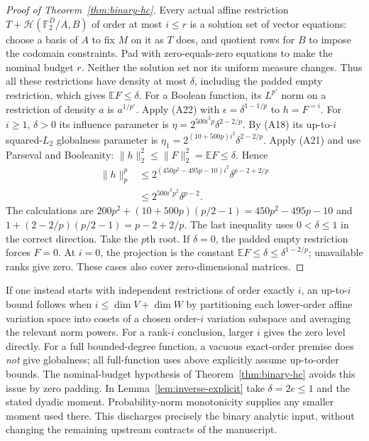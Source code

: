 \begin{proof}[Proof of Theorem~\ref{thm:binary-hc}]
Every actual affine restriction $T+\mathcal H(\mathbb F_2^D/A,B)$ of
order at most $i\le r$ is a solution set of vector equations:
choose a basis of $A$ to fix $M$ on it as $T$ does, and quotient rows
for $B$ to impose the codomain constraints. Pad with zero-equals-zero
equations to make the nominal budget $r$. Neither the solution set nor
its uniform measure changes. Thus all these restrictions have density
at most $\delta$, including the padded empty restriction, which gives
$\mathbb EF\le\delta$.
For a Boolean function, its $L^{p'}$ norm on a restriction of density
$a$ is $a^{1/p'}$. Apply (A22) with
$\epsilon=\delta^{1-1/p}$ to $h=F^{=i}$. For $i\ge1$, $\delta>0$ its
influence parameter is
$\eta=2^{500i^2p}\delta^{2-2/p}$.
By (A18) its up-to-$i$ squared-$L_2$ globalness parameter is
$\eta_1=2^{(10+500p)i^2}\delta^{2-2/p}$.
Apply (A21) and use Parseval and Booleanity:
$\|h\|_2^2\le\|F\|_2^2=\mathbb EF\le\delta$. Hence
\[
 \begin{split}
 \|h\|_p^p
 &\le2^{(450p^2-495p-10)i^2}\delta^{p-2+2/p}\\
 &\le2^{500i^2p^2}\delta^{p-2}.
 \end{split}
\]
The calculations are
$200p^2+(10+500p)(p/2-1)=450p^2-495p-10$ and
$1+(2-2/p)(p/2-1)=p-2+2/p$.
The last inequality uses $0<\delta\le1$ in the correct direction.
Take the $p$th root. If $\delta=0$, the padded empty restriction forces
$F=0$. At $i=0$, the projection is the constant
$\mathbb EF\le\delta\le\delta^{1-2/p}$; unavailable ranks give zero.
These cases also cover zero-dimensional matrices.
\end{proof}

If one instead starts with independent restrictions of order exactly
$i$, an up-to-$i$ bound follows when $i\le\dim V+\dim W$ by partitioning
each lower-order affine variation space into cosets of a chosen
order-$i$ variation subspace and averaging the relevant norm powers.
For a rank-$i$ conclusion, larger $i$ gives the zero level directly.
For a full bounded-degree function, a vacuous exact-order premise does
\emph{not} give globalness; all full-function uses above explicitly
assume up-to-order bounds. The nominal-budget hypothesis of
Theorem~\ref{thm:binary-hc} avoids this issue by zero padding.
In Lemma~\ref{lem:inverse-explicit} take $\delta=2e\le1$ and the
stated dyadic moment. Probability-norm monotonicity supplies any smaller
moment used there. This discharges precisely the binary analytic input,
without changing the remaining upstream contracts of the manuscript.
